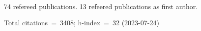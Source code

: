 74 refereed publications. 13 refeered publications as first author.

Total citations~=~3408; h-index~=~32 (2023-07-24)